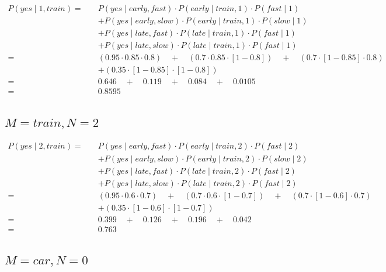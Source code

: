 \documentclass[12pt,letterpaper]{article}
\begin{document}
\begin{align*}
    P(yes \mid 1, train) = \quad &P(yes \mid early, fast) \cdot P(early \mid train, 1) \cdot P(fast \mid 1) \\
                                &+ P(yes \mid early, slow) \cdot P(early \mid train, 1) \cdot P(slow \mid 1) \\
                                &+ P(yes \mid late, fast) \cdot P(late \mid train, 1) \cdot P(fast \mid 1) \\
                                &+ P(yes \mid late, slow) \cdot P(late \mid train, 1) \cdot P(fast \mid 1) \\
    = \quad &(0.95 \cdot 0.85 \cdot 0.8) \quad + \quad (0.7 \cdot 0.85 \cdot [1-0.8]) \quad + \quad (0.7 \cdot [1-0.85] \cdot 0.8) \\
            &+ (0.35 \cdot [1-0.85] \cdot [1-0.8]) \\
    = \quad &0.646 \quad + \quad 0.119 \quad + \quad 0.084 \quad + \quad 0.0105 \\
    = \quad &0.8595
\end{align*}

\subsection{$M = train, N = 2$}

\begin{align*}
    P(yes \mid 2, train) = \quad &P(yes \mid early, fast) \cdot P(early \mid train, 2) \cdot P(fast \mid 2) \\
                                &+ P(yes \mid early, slow) \cdot P(early \mid train, 2) \cdot P(slow \mid 2) \\
                                &+ P(yes \mid late, fast) \cdot P(late \mid train, 2) \cdot P(fast \mid 2) \\
                                &+ P(yes \mid late, slow) \cdot P(late \mid train, 2) \cdot P(fast \mid 2) \\
    = \quad &(0.95 \cdot 0.6 \cdot 0.7) \quad + \quad (0.7 \cdot 0.6 \cdot [1-0.7]) \quad + \quad (0.7 \cdot [1-0.6] \cdot 0.7) \\
            &+ (0.35 \cdot [1-0.6] \cdot [1-0.7]) \\
    = \quad &0.399 \quad + \quad 0.126 \quad + \quad 0.196 \quad + \quad 0.042 \\
    = \quad &0.763
\end{align*}

\subsection{$M = car, N = 0$}
\end{document}
